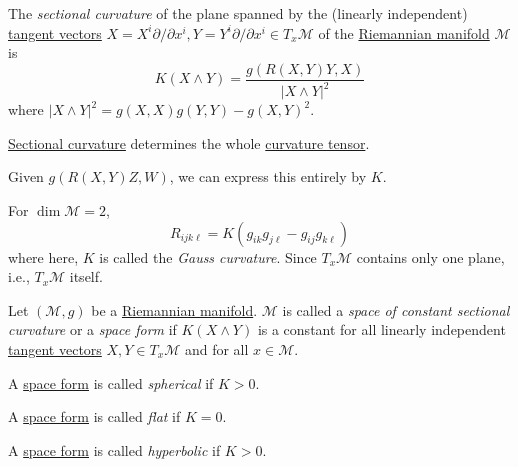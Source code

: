 \begin{definition}\label{def:sectional-curvature}
	The \emph{sectional curvature} of the plane spanned by the (linearly independent) \hyperref[def:tangent-vector]{tangent vectors} \(X = X^i \partial / \partial x^i, Y= Y^i \partial / \partial x^i\in T_x \mathcal{M} \) of the \hyperref[def:Riemannian-manifold]{Riemannian manifold} \(\mathcal{M} \) is
	\[
		K(X \wedge Y) = \frac{g(R(X, Y) Y, X)}{\vert X\wedge Y \vert^2 }
	\]
	where \(\vert X \wedge Y \vert ^2 = g(X, X) g(Y, Y) - g(X, Y)^2\).
\end{definition}

\begin{remark}
	\hyperref[def:sectional-curvature]{Sectional curvature} determines the whole \hyperref[def:Riemannian-curvature-tensor]{curvature tensor}.
\end{remark}
\begin{explanation}
	Given \(g(R(X, Y)Z, W)\), we can express this entirely by \(K\).
\end{explanation}

\begin{remark}
	For \(\dim \mathcal{M} = 2\),
	\[
		R_{ijk\ell} = K(g_{ik} g_{j \ell } - g_{ij} g_{k \ell })
	\]
	where here, \(K\) is called the \emph{Gauss curvature}.	Since \(T_x \mathcal{M} \) contains only one plane, i.e., \(T_x \mathcal{M} \) itself.
\end{remark}

\begin{definition}\label{def:space-form}
	Let \((\mathcal{M} , g)\) be a \hyperref[def:Riemannian-manifold]{Riemannian manifold}. \(\mathcal{M} \) is called a \emph{space of constant sectional curvature} or a \emph{space form} if \(K(X\wedge Y) \) is a constant for all linearly independent \hyperref[def:tangent-vector]{tangent vectors} \(X, Y\in T_x \mathcal{M} \) and for all \(x\in \mathcal{M} \).

	\begin{definition}[Spherical]\label{def:space-form-spherical}
		A \hyperref[def:space-form]{space form} is called \emph{spherical} if \(K > 0\).
	\end{definition}

	\begin{definition}[Flat]\label{def:space-form-flat}
		A \hyperref[def:space-form]{space form} is called \emph{flat} if \(K = 0\).
	\end{definition}

	\begin{definition}[Hyperbolic]\label{def:space-form-hyperbolic}
		A \hyperref[def:space-form]{space form} is called \emph{hyperbolic} if \(K > 0\).
	\end{definition}
\end{definition}

